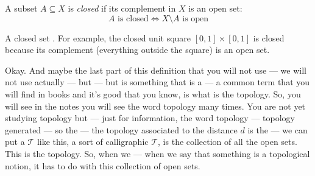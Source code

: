 \begin{math-stroke}
\begin{definition}\label{def:closed-set}
A subset $A \subseteq X$ is \emph{closed} if its complement in $X$ is an open set:
\[ A \text{ is closed} \iff X \setminus A \text{ is open} \]
\end{definition}

\begin{center}
\end{center}

\begin{explanation-of-steps}
A closed set . For example, the closed unit square $[0, 1] \times [0, 1]$ is closed because its complement (everything outside the square) is an open set.
\end{explanation-of-steps}
\end{math-stroke}

\begin{spoken-clean}[00:10:16 - 00:12:03]
Okay. And maybe the last part of this definition that you will not use --- we will not use actually --- but --- but is something that is a --- a common term that you will find in books and it's good that you know, is what is the topology. So, you will see in the notes you will see the word topology many times. You are not yet studying topology but --- just for information, the word topology --- topology generated --- so the --- the topology associated to the distance $d$ is the --- we can put a $\mathcal{T}$ like this, a sort of calligraphic $\mathcal{T}$, is the collection of all the open sets. This is the topology. So, when we --- when we say that something is a topological notion, it has to do with this collection of open sets.
\end{spoken-clean}

